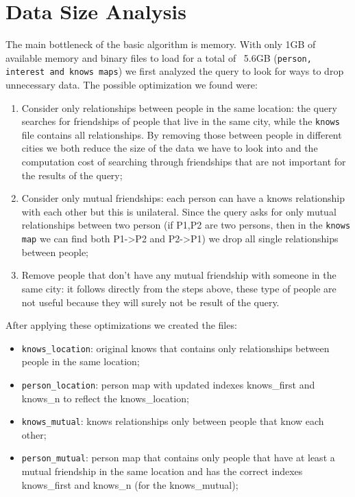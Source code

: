 \section{Data Size Analysis}
The main bottleneck of the basic algorithm is memory. With only 1GB of available memory and binary files to load for a total of ~5.6GB (\texttt{person, interest and knows maps}) we first analyzed the query to look for ways to drop unnecessary data. The possible optimization we found were:
\begin{enumerate}
    \item Consider only relationships between people in the same location: the query searches for friendships of people that live in the same city, while the \texttt{knows} file contains all relationships. By removing those between people in different cities we both reduce the size of the data we have to look into and the computation cost of searching through friendships that are not important for the results of the query;
    \item Consider only mutual friendships: each person can have a knows relationship with each other but this is unilateral. Since the query asks for only mutual relationships between two person (if P1,P2 are two persons, then in the \texttt{knows map} we can find both P1->P2 and P2->P1) we drop all single relationships between people;
    \item Remove people that don't have any mutual friendship with someone in the same city: it follows directly from the steps above, these type of people are not useful because they will surely not be result of the query.
\end{enumerate}
After applying these optimizations we created the files:
\begin{itemize}
    \item \texttt{knows\_location}: original knows that contains only relationships between people in the same location;
    \item \texttt{person\_location}: person map with updated indexes knows\_first and knows\_n to reflect the knows\_location;
    \item \texttt{knows\_mutual}: knows relationships only between people that know each other;
    \item \texttt{person\_mutual}: person map that contains only people that have at least a mutual friendship in the same location and has the correct indexes knows\_first and knows\_n (for the knows\_mutual);
\end{itemize}


